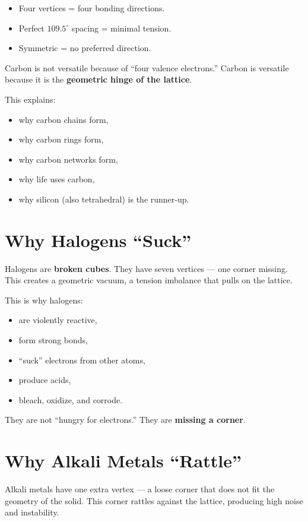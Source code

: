 \documentclass[11pt, letterpaper, openany]{book}
\begin{document}
\begin{itemize}
    \item Four vertices = four bonding directions.
    \item Perfect $109.5^\circ$ spacing = minimal tension.
    \item Symmetric = no preferred direction.
\end{itemize}

Carbon is not versatile because of “four valence electrons.”  
Carbon is versatile because it is the \textbf{geometric hinge of the lattice}.

This explains:

\begin{itemize}
    \item why carbon chains form,
    \item why carbon rings form,
    \item why carbon networks form,
    \item why life uses carbon,
    \item why silicon (also tetrahedral) is the runner‑up.
\end{itemize}

\section{Why Halogens ``Suck''}

Halogens are \textbf{broken cubes}. They have seven vertices — one corner missing. This
creates a geometric vacuum, a tension imbalance that pulls on the lattice.

This is why halogens:

\begin{itemize}
    \item are violently reactive,
    \item form strong bonds,
    \item “suck” electrons from other atoms,
    \item produce acids,
    \item bleach, oxidize, and corrode.
\end{itemize}

They are not “hungry for electrons.”  
They are \textbf{missing a corner}.

\section{Why Alkali Metals ``Rattle''}

Alkali metals have one extra vertex — a loose corner that does not fit the geometry of the
solid. This corner rattles against the lattice, producing high noise and instability.
\end{document}
